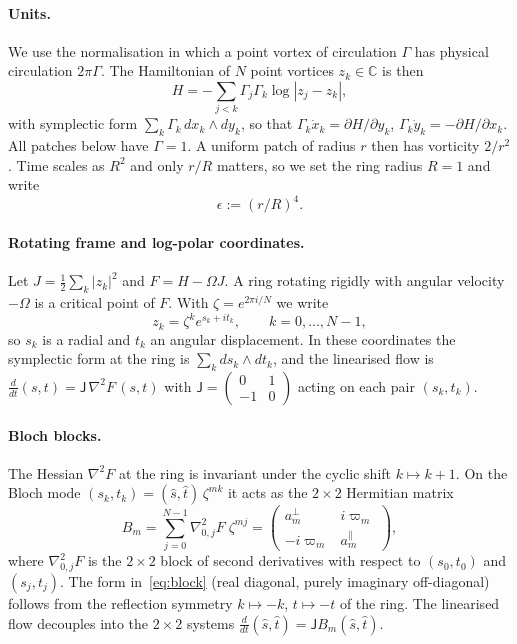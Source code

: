 \documentclass[11pt]{article}
\theoremstyle{definition}
\theoremstyle{remark}
\newcommand{\C}{\mathbb{C}}
\begin{document}
\paragraph{Units.} We use the normalisation in which a point vortex of circulation $\Gamma$ has physical
circulation $2\pi\Gamma$. The Hamiltonian of $N$ point vortices $z_k\in\C$ is then
\[ H=-\sum_{j<k}\Gamma_j\Gamma_k\log|z_j-z_k|, \]
with symplectic form $\sum_k\Gamma_k\,dx_k\wedge dy_k$, so that $\Gamma_k\dot x_k=\partial H/\partial y_k$,
$\Gamma_k\dot y_k=-\partial H/\partial x_k$. All patches below have $\Gamma=1$. A uniform patch of radius $r$ then has
vorticity $2/r^2$. Time scales as $R^2$ and only $r/R$ matters, so we set the ring radius $R=1$ and write
\[ \epsilon:=(r/R)^4 . \]

\paragraph{Rotating frame and log-polar coordinates.} Let $J=\frac12\sum_k|z_k|^2$ and $F=H-\Omega J$. A ring rotating
rigidly with angular velocity $-\Omega$ is a critical point of $F$. With $\zeta=e^{2\pi i/N}$ we write
\[ z_k=\zeta^k e^{s_k+it_k},\qquad k=0,\dots,N-1, \]
so $s_k$ is a radial and $t_k$ an angular displacement. In these coordinates the symplectic form at the ring is
$\sum_k ds_k\wedge dt_k$, and the linearised flow is $\frac{d}{dt}(s,t)=\mathsf J\,\nabla^2F\,(s,t)$ with
$\mathsf J=\left(\begin{smallmatrix}0&1\\-1&0\end{smallmatrix}\right)$ acting on each pair $(s_k,t_k)$.

\paragraph{Bloch blocks.} The Hessian $\nabla^2F$ at the ring is invariant under the cyclic shift $k\mapsto k+1$. On the
Bloch mode $(s_k,t_k)=(\hat s,\hat t)\,\zeta^{mk}$ it acts as the $2\times2$ Hermitian matrix
\begin{equation}\label{eq:block}
B_m=\sum_{j=0}^{N-1}\nabla^2_{0,j}F\;\zeta^{mj}=\begin{pmatrix}a^\perp_m& i\varpi_m\\-i\varpi_m&a^\parallel_m\end{pmatrix},
\end{equation}
where $\nabla^2_{0,j}F$ is the $2\times2$ block of second derivatives with respect to $(s_0,t_0)$ and $(s_j,t_j)$. The form
in~\eqref{eq:block} (real diagonal, purely imaginary off-diagonal) follows from the reflection symmetry $k\mapsto-k$,
$t\mapsto-t$ of the ring. The linearised flow decouples into the $2\times2$ systems $\frac{d}{dt}(\hat s,\hat t)=\mathsf J B_m(\hat s,\hat t)$.
\end{document}

